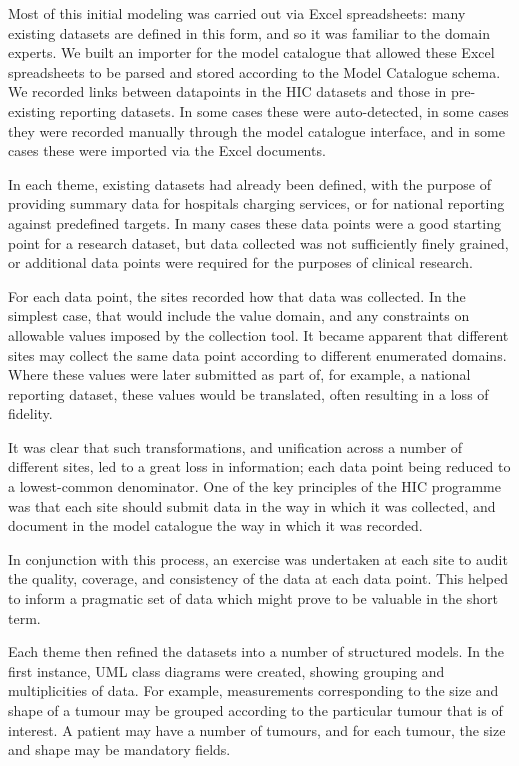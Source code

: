 Most of this initial modeling was carried out via Excel spreadsheets:
many existing datasets are defined in this form, and so it was familiar to
the domain experts.  We built an importer for the model catalogue that
allowed these Excel spreadsheets to be parsed and stored according to
the Model Catalogue schema.  We recorded links between datapoints in
the HIC datasets and those in pre-existing reporting datasets.  In
some cases these were auto-detected, in some cases they were recorded manually
through the model catalogue interface, and in some cases these were
imported via the Excel documents.  

In each theme, existing datasets had already been defined, with the
purpose of providing summary data for hospitals charging services, or
for national reporting against predefined targets.  In many cases
these data points were a good starting point for a research dataset,
but data collected was not sufficiently finely grained, or additional
data points were required for the purposes of clinical research.

For each data point, the sites recorded how that data was collected.
In the simplest case, that would include the value domain, and any
constraints on allowable values imposed by the collection tool.  It
became apparent that different sites may collect the same data point
according to different enumerated domains.  Where these values were
later submitted as part of, for example, a national reporting dataset,
these values would be translated, often resulting in a loss of
fidelity.  

It was clear that such transformations, and unification across a
number of different sites, led to a great loss in information; each
data point being reduced to a lowest-common denominator.  One of the
key principles of the HIC programme was that each site should submit
data in the way in which it was collected, and document in the model
catalogue the way in which it was recorded.


In conjunction with this process, an exercise was undertaken at each
site to audit the quality, coverage, and consistency of the data at
each data point.  This helped to inform a pragmatic set of data which
might prove to be valuable in the short term.

Each theme then refined the datasets into a number of structured
models.  In the first instance, UML class diagrams were created,
showing grouping and multiplicities of data.  For example,
measurements corresponding to the size and shape of a tumour may be
grouped according to the particular tumour that is of interest.  A
patient may have a number of tumours, and for each tumour, the size
and shape may be mandatory fields.


